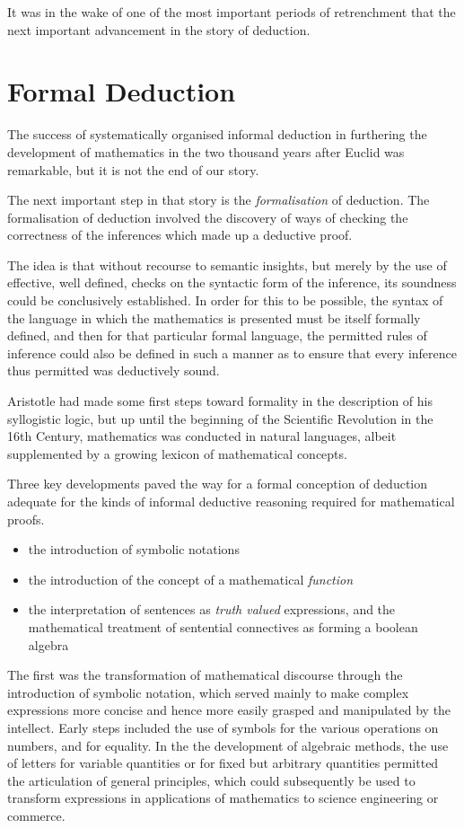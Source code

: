 \documentclass[10pt,titlepage]{book}
\begin{document}
It was in the wake of one of the most important periods of retrenchment that the next important advancement in the story of deduction.

\section{Formal Deduction}

The success of systematically organised informal deduction in furthering the development of mathematics in the two thousand years after Euclid was remarkable, but it is not the end of our story.

The next important step in that story is the \emph{formalisation} of
deduction.
The formalisation of deduction involved the discovery of ways of checking the correctness of the inferences which made up a deductive proof.

The idea is that without recourse to semantic insights, but merely by the use of effective, well defined, checks on the syntactic form of the inference, its soundness could be conclusively established.
In order for this to be possible, the syntax of the language in which the mathematics is presented must be itself formally defined, and then for that particular formal language, the permitted rules of inference could also be defined in such a manner as to ensure that every inference thus permitted was deductively sound.

Aristotle had made some first steps toward formality in the description of his syllogistic logic, but up until the beginning of the Scientific Revolution in the 16th Century, mathematics was conducted in natural languages, albeit supplemented by a growing lexicon of mathematical concepts.

Three key developments paved the way for a formal conception of deduction adequate for the kinds of informal deductive reasoning required for mathematical proofs.

\begin{itemize}
\item the introduction of symbolic notations
\item the introduction of the concept of a mathematical \emph{function}
\item the interpretation of sentences as \emph{truth valued} expressions, and the mathematical treatment of sentential connectives as forming a boolean algebra
\end{itemize}

The first was the transformation of mathematical discourse through the introduction of symbolic notation, which served mainly to make complex expressions more concise and hence more easily grasped and manipulated by the intellect.
Early steps included the use of symbols for the various operations on numbers, and for equality.
In the the development of algebraic methods, the use of letters for variable quantities or for fixed but arbitrary quantities permitted the articulation of general principles, which could subsequently be used to transform expressions in applications of mathematics to science engineering or commerce.
\end{document}
